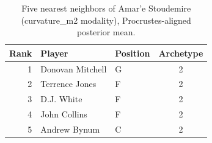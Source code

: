 \begin{table}[htbp]
  \centering\small
  \begin{tabular}{rllc}
    \toprule
    Rank & Player & Position & Archetype \\
    \midrule
    1 & Donovan Mitchell & G & 2 \\
    2 & Terrence Jones & F & 2 \\
    3 & D.J. White & F & 2 \\
    4 & John Collins & F & 2 \\
    5 & Andrew Bynum & C & 2 \\
    \bottomrule
  \end{tabular}
  \caption{Five nearest neighbors of Amar'e Stoudemire (curvature_m2 modality), Procrustes-aligned posterior mean.}
  \label{tab:Amar_e_Stoudemire_neighbors_curvature_m2}
\end{table}

